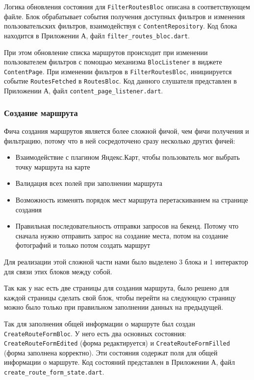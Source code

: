 Логика обновления состояния для \texttt{FilterRoutesBloc} описана в соответствующем файле. Блок обрабатывает события получения доступных фильтров и изменения пользовательских фильтров, взаимодействуя с \texttt{ContentRepository}. Код блока находится в Приложении А, файл \texttt{filter\_routes\_bloc.dart}.

При этом обновление списка маршрутов происходит при изменении пользователем фильтров с помощью механизма \texttt{BlocListener} в виджете \texttt{ContentPage}. При изменении фильтров в \texttt{FilterRoutesBloc}, инициируется событие \texttt{RoutesFetched} в \texttt{RoutesBloc}. Код данного слушателя представлен в Приложении А, файл \texttt{content\_page\_listener.dart}.

\subsubsection*{Создание маршрута}
Фича создания маршрутов является более сложной фичой, чем фичи получения и фильтрацию, потому что в ней сосредоточено сразу несколько других фичей:

\begin{itemize}
    \item Взаимодействие с плагином Яндекс.Карт, чтобы пользователь мог выбрать точку маршрута на карте
    \item Валидация всех полей при заполнении маршрута
    \item Возможность изменять порядок мест маршрута перетаскиванием на странице создания
    \item Правильная последовательность отправки запросов на бекенд. Потому что сначала нужно отправить запрос на создание места, потом на создание фотографий и только потом создать маршрут
\end{itemize}

\noindent Для реализации этой сложной части нами было выделено 3 блока и 1 интерактор для связи этих блоков между собой.

Так как у нас есть две страницы для создания маршрута, было решено для каждой страницы сделать свой блок, чтобы перейти на следующую страницу можно было только при правильном заполнении данных на предыдущей. 

Так для  заполнения общей информации о маршруте был создан \texttt{CreateRouteFormBloc}. У него есть два основных состояния: \texttt{CreateRouteFormEdited} (форма редактируется) и \texttt{CreateRouteFormFilled} (форма заполнена корректно). Эти состояния содержат поля для общей информации о маршруте. Код состояний представлен в Приложении А, файл \texttt{create\_route\_form\_state.dart}.

